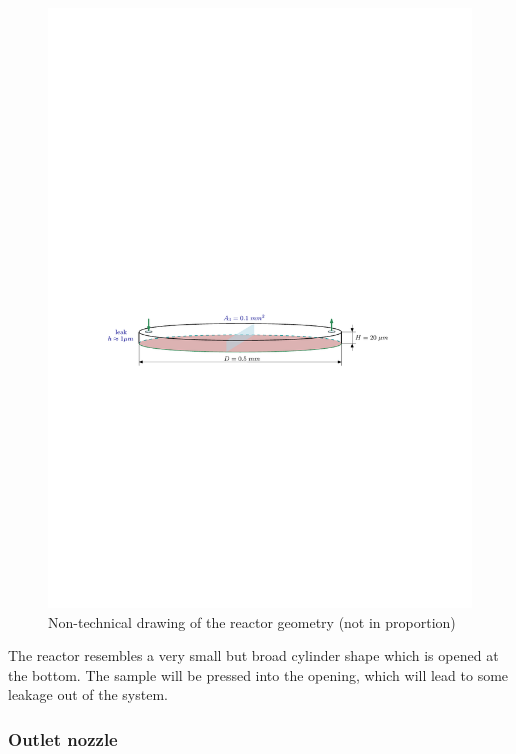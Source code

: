 	\begin{figure}[H]
	    \centering
	    \includegraphics[width=1.0\textwidth]{src/03_analytical-work/fig_reactor-geometry.pdf}
	    \caption{Non-technical drawing of the reactor geometry (not in proportion)}
	    \label{fig:geometry-reactor}
	\end{figure}
	The reactor resembles a very small but broad cylinder shape which is opened at the bottom.
	The sample will be pressed into the opening, which will lead to some leakage out of the system.
	
\subsubsection*{Outlet nozzle}
	
